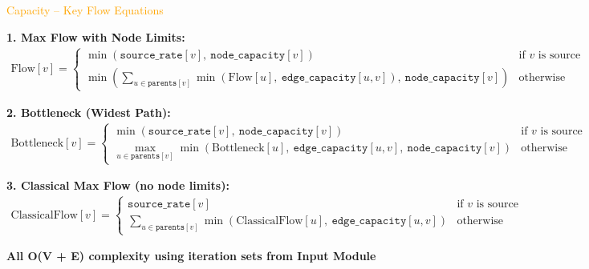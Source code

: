 \documentclass[aspectratio=169]{beamer}
\begin{document}
\begin{frame}{\textcolor{orange}{Capacity – Key Flow Equations}}
\footnotesize %

\textbf{1. Max Flow with Node Limits:}
\begin{align*}
\text{Flow}[v] =
\begin{cases}
\min(\texttt{source\_rate}[v],\ \texttt{node\_capacity}[v]) & \text{if } v \text{ is source} \\
\min\left(\sum\limits_{u \in \texttt{parents}[v]} \min(\text{Flow}[u],\ \texttt{edge\_capacity}[u,v]),\ \texttt{node\_capacity}[v]\right) & \text{otherwise}
\end{cases}
\end{align*}

\vspace{0.1cm}

\textbf{2. Bottleneck (Widest Path):}
\begin{align*}
\text{Bottleneck}[v] =
\begin{cases}
\min(\texttt{source\_rate}[v],\ \texttt{node\_capacity}[v]) & \text{if } v \text{ is source} \\
\max\limits_{u \in \texttt{parents}[v]} \min(\text{Bottleneck}[u],\ \texttt{edge\_capacity}[u,v],\ \texttt{node\_capacity}[v]) & \text{otherwise}
\end{cases}
\end{align*}

\vspace{0.1cm}

\textbf{3. Classical Max Flow (no node limits):}
\begin{align*}
\text{ClassicalFlow}[v] =
\begin{cases}
\texttt{source\_rate}[v] & \text{if } v \text{ is source} \\
\sum\limits_{u \in \texttt{parents}[v]} \min(\text{ClassicalFlow}[u],\ \texttt{edge\_capacity}[u,v]) & \text{otherwise}
\end{cases}
\end{align*}

\vspace{0.2cm}
\begin{center}
    
\textbf{All \textcolor{juliagreen}{O(V + E)} complexity using iteration sets from Input Module}

\end{center}
\end{frame}
\end{document}
